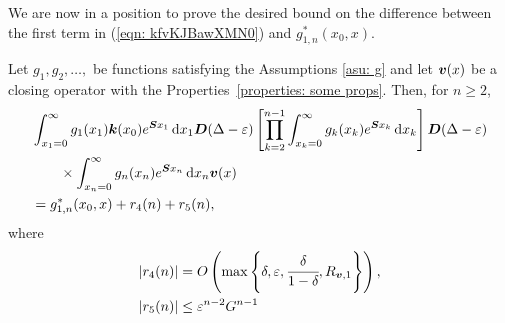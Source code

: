 We are now in a position to prove the desired bound on the difference between the first term in (\ref{eqn: kfvKJBawXMN0}) and \(g^*_{1,n}(x_0,x)\).
\begin{lem}\label{lem: lst convergence}
	Let \(g_1,g_2,\dots,\) be functions satisfying the Assumptions \ref{asu: g} and let \(\boldsymbol v(x)\) be a closing operator with the Properties~\ref{properties: some props}. Then, for \(n\geq 2\),  
	\begin{align}
		&\int_{x_1=0}^\infty g_1(x_1) \boldsymbol k(x_0) e^{\boldsymbol{S}x_1}\, \mathrm{d} x_1 \boldsymbol D(\Delta-\varepsilon)
            	\left[\prod_{k=2}^{n-1}\int_{x_k=0}^\infty g_k(x_k) e^{\boldsymbol{S}x_k} \, \mathrm{d} x_k \right]
		\boldsymbol D(\Delta-\varepsilon) \nonumber 
		\\&\qquad\times\int_{x_n=0}^\infty g_{n}(x_n) e^{\boldsymbol{S}x_n} \, \mathrm{d} x_n {\boldsymbol v}(x) \nonumber 
		\\& =g^{*}_{1,n}(x_0,x) + r_4(n) + r_5(n), \label{eqn: rhs g 2}
	\end{align}
	where  
	\begin{align*}
		|r_4(n)|&= O\left(\max\left\{\delta,\varepsilon,\cfrac{\delta}{1-\delta},R_{{\boldsymbol v},1}\right\}\right),
		\\|r_5(n)| &\leq \varepsilon^{n-2}G^{n-1}
	\end{align*}
\end{lem}
